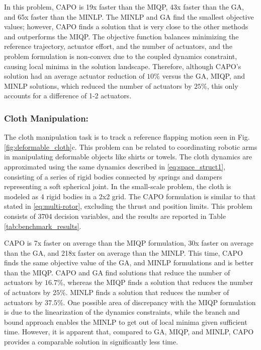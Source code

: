 \documentclass[runningheads]{llncs}
\begin{document}
In this problem, CAPO is 19x faster than the MIQP, 43x faster than the GA, and 65x faster than the MINLP. The MINLP and GA find the smallest objective values; however, CAPO finds a solution that is very close to the other methods and outperforms the MIQP. The objective function balances minimizing the reference trajectory, actuator effort, and the number of actuators, and the problem formulation is non-convex due to the coupled dynamics constraint, causing local minima in the solution landscape. Therefore, although CAPO's solution had an average actuator reduction of $10\%$ versus the GA, MIQP, and MINLP solutions, which reduced the number of actuators by $25\%$, this only accounts for a difference of 1-2 actuators.
\vspace{-15pt}

\subsubsection{Cloth Manipulation:}
The cloth manipulation task is to track a reference flapping motion seen in Fig. \ref{fig:deformable_cloth}c. This problem can be related to coordinating robotic arms in manipulating deformable objects like shirts or towels. The cloth dynamics are approximated using the same dynamics described in \eqref{eq:space_struct1}, consisting of a series of rigid bodies connected by springs and dampers representing a soft spherical joint. In the small-scale problem, the cloth is modeled as 4 rigid bodies in a 2x2 grid. The CAPO formulation is similar to that stated in \eqref{eq:multi-rotor}, excluding the thrust and position limits. This problem consists of 3704 decision variables, and the results are reported in Table \ref{tab:benchmark_results}. 

CAPO is 7x faster on average than the MIQP formulation, 30x faster on average than the GA, and 218x faster on average than the MINLP. This time, CAPO finds the same objective value of the GA, and MINLP formulations and is better than the MIQP. CAPO and GA find solutions that reduce the number of actuators by $16.7\%$, whereas the MIQP finds a solution that reduces the number of actuators by $25\%$. MINLP finds a solution that reduces the number of actuators by $37.5\%$. One possible area of discrepancy with the MIQP formulation is due to the linearization of the dynamics constraints, while the branch and bound approach enables the MINLP to get out of local minima given sufficient time. However, it is apparent that, compared to GA, MIQP, and MINLP, CAPO provides a comparable solution in significantly less time.
\vspace{-15pt}
\end{document}
